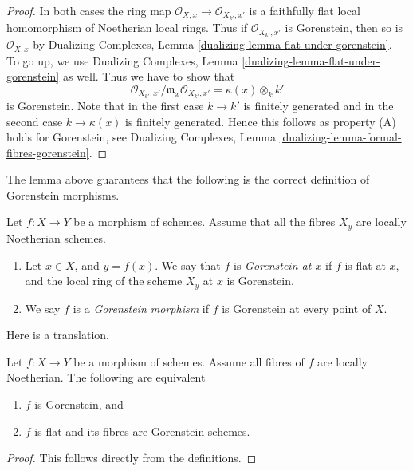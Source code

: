 \begin{proof}
In both cases the ring map $\mathcal{O}_{X, x} \to \mathcal{O}_{X_{k'}, x'}$
is a faithfully flat local homomorphism of Noetherian local rings.
Thus if $\mathcal{O}_{X_{k'}, x'}$ is Gorenstein, then so is
$\mathcal{O}_{X, x}$ by
Dualizing Complexes, Lemma \ref{dualizing-lemma-flat-under-gorenstein}.
To go up, we use
Dualizing Complexes, Lemma \ref{dualizing-lemma-flat-under-gorenstein} as well.
Thus we have to show that
$$
\mathcal{O}_{X_{k'}, x'}/\mathfrak m_x \mathcal{O}_{X_{k'}, x'} =
\kappa(x) \otimes_k k'
$$
is Gorenstein. Note that in the first case $k \to k'$ is finitely
generated and in the second case $k \to \kappa(x)$ is finitely
generated. Hence this follows as property (A) holds for
Gorenstein, see Dualizing Complexes, Lemma
\ref{dualizing-lemma-formal-fibres-gorenstein}.
\end{proof}

\noindent
The lemma above guarantees that the following is the correct definition
of Gorenstein morphisms.

\begin{definition}
\label{definition-gorenstein-morphism}
Let $f : X \to Y$ be a morphism of schemes.
Assume that all the fibres $X_y$ are locally Noetherian schemes.
\begin{enumerate}
\item Let $x \in X$, and $y = f(x)$. We say that $f$ is
{\it Gorenstein at $x$} if $f$ is flat at $x$, and the
local ring of the scheme $X_y$ at $x$ is Gorenstein.
\item We say $f$ is a {\it Gorenstein morphism} if $f$ is
Gorenstein at every point of $X$.
\end{enumerate}
\end{definition}

\noindent
Here is a translation.

\begin{lemma}
\label{lemma-gorenstein-morphism}
Let $f : X \to Y$ be a morphism of schemes.
Assume all fibres of $f$ are locally Noetherian.
The following are equivalent
\begin{enumerate}
\item $f$ is Gorenstein, and
\item $f$ is flat and its fibres are Gorenstein schemes.
\end{enumerate}
\end{lemma}

\begin{proof}
This follows directly from the definitions.
\end{proof}

